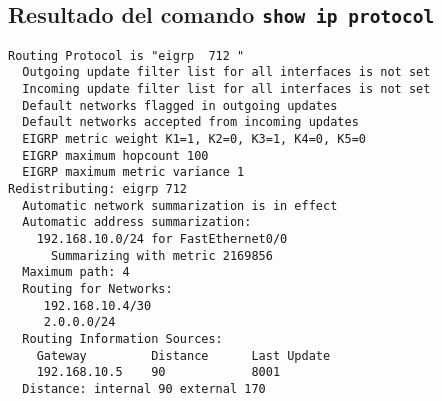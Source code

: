 \documentclass[12pt, times]{simauth}
\begin{document}
\subsection{Resultado del comando \texttt{show ip protocol}}
\begin{verbatim}
Routing Protocol is "eigrp  712 " 
  Outgoing update filter list for all interfaces is not set 
  Incoming update filter list for all interfaces is not set 
  Default networks flagged in outgoing updates  
  Default networks accepted from incoming updates 
  EIGRP metric weight K1=1, K2=0, K3=1, K4=0, K5=0
  EIGRP maximum hopcount 100
  EIGRP maximum metric variance 1
Redistributing: eigrp 712
  Automatic network summarization is in effect  
  Automatic address summarization: 
    192.168.10.0/24 for FastEthernet0/0
      Summarizing with metric 2169856
  Maximum path: 4
  Routing for Networks:  
     192.168.10.4/30
     2.0.0.0/24
  Routing Information Sources:  
    Gateway         Distance      Last Update 
    192.168.10.5    90            8001       
  Distance: internal 90 external 170
\end{verbatim}
\end{document}
